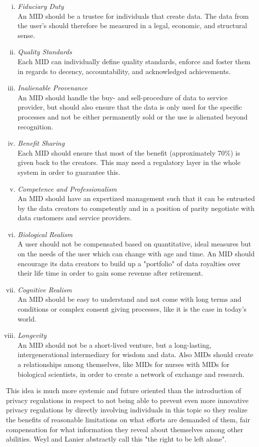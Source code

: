 \documentclass[a4paper,12pt]{report}
\begin{document}
		\begin{enumerate}[(i)]
			\item \textit{Fiduciary Duty} \\
			An MID should be a trustee for individuals that create data. The data from the user's should therefore be measured in a legal, economic, and structural sense.
			\item \textit{Quality Standards} \\
			Each MID can individually define quality standards, enforce and foster them in regards to decency, accountability, and acknowledged achievements.
			\item \textit{Inalienable Provenance} \\
			An MID should handle the buy- and sell-procedure of data to service provider, but should also ensure that the data is only used for the specific processes and not be either permanently sold or the use is alienated beyond recognition.
			\item \textit{Benefit Sharing} \\
			Each MID should ensure that most of the benefit (approximately 70\%) is given back to the creators. This may need a regulatory layer in the whole system in order to guarantee this.
			\item \textit{Competence and Professionalism} \\
			An MID should have an expertized management such that it can be entrusted by the data creators to competently and in a position of parity negotiate with data customers and service providers.
			\item \textit{Biological Realism} \\
			A user should not be compensated based on quantitative, ideal measures but on the needs of the user which can change with age and time. An MID should encourage its data creators to build up a "portfolio" of data royalties over their life time in order to gain some revenue after retirement.
			\item \textit{Cognitive Realism} \\
			An MID should be easy to understand and not come with long terms and conditions or complex consent giving processes, like it is the case in today's world.
			\item \textit{Longevity} \\
			An MID should not be a short-lived venture, but a long-lasting, intergenerational intermediary for wisdom and data. Also MIDs should create a relationships among themselves, like MIDs for nurses with MIDs for biological scientists, in order to create a network of exchange and research.
		\end{enumerate}
		This idea is much more systemic and future oriented than the introduction of privacy regulations in respect to not being able to prevent even more innovative privacy regulations by directly involving individuals in this topic so they realize the benefits of reasonable limitations on what efforts are demanded of them, fair compensation for what information they reveal about themselves among other abilities. Weyl and Lanier abstractly call this "the right to be left alone".
	\closesection
	
\end{document}
